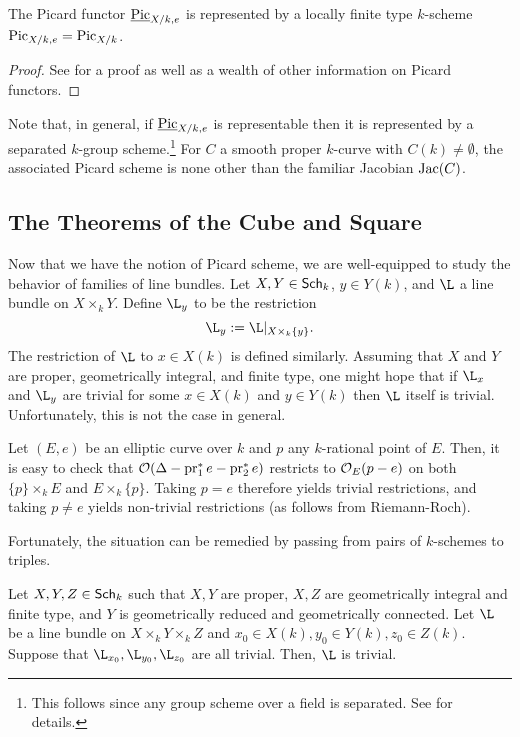 \documentclass[11pt]{article}
\begin{document}
\begin{theorem}\label{Picard_Rep_Thm}
The Picard functor $\underline{\operatorname{Pic}}_{X/k,e}$ is represented by a locally finite type $k$-scheme $\operatorname{Pic}_{X/k,e}=\operatorname{Pic}_{X/k}$.
\end{theorem}

\begin{proof}
See \cite[\textrm{Part 5}]{Fantechi} for a proof as well as a wealth of other information on Picard functors.
\end{proof}

Note that, in general, if $\underline{\operatorname{Pic}}_{X/k,e}$ is representable then it is represented by a separated $k$-group scheme.\footnote{This follows since any group scheme over a field is separated. See \cite[\textrm{Tag 047G and 047J}]{Stack} for details.} For $C$ a smooth proper $k$-curve with $C(k)\neq\emptyset$, the associated Picard scheme is none other than the familiar Jacobian $\operatorname{Jac}(C)$.

\subsection{The Theorems of the Cube and Square}
Now that we have the notion of Picard scheme, we are well-equipped to study the behavior of families of line bundles. Let $X,Y\in\operatorname{\mathsf{Sch}}_k$, $y\in Y(k)$, and $\L$ a line bundle on $X\times_kY$. Define $\L_y$ to be the restriction
$$\L_y:=\L|_{X\times_k\{y\}}.$$
The restriction of $\L$ to $x\in X(k)$ is defined similarly. Assuming that $X$ and $Y$ are proper, geometrically integral, and finite type, one might hope that if $\L_x$ and $\L_y$ are trivial for some $x\in X(k)$ and $y\in Y(k)$ then $\L$ itself is trivial. Unfortunately, this is not the case in general.

\begin{example}
Let $(E,e)$ be an elliptic curve over $k$ and $p$ any $k$-rational point of $E$. Then, it is easy to check that $\mathcal{O}(\Delta-\operatorname{pr}_1^*e-\operatorname{pr}_2^*e)$ restricts to $\mathcal{O}_E(p-e)$ on both $\{p\}\times_kE$ and $E\times_k\{p\}$. Taking $p=e$ therefore yields trivial restrictions, and taking $p\neq e$ yields non-trivial restrictions (as follows from Riemann-Roch).
\end{example}

Fortunately, the situation can be remedied by passing from pairs of $k$-schemes to triples.

\begin{theorem}\label{Cube_Thm}
Let $X,Y,Z\in\operatorname{\mathsf{Sch}}_k$ such that $X,Y$ are proper, $X,Z$ are geometrically integral and finite type, and $Y$ is geometrically reduced and geometrically connected. Let $\L$ be a line bundle on $X\times_kY\times_kZ$ and $x_0\in X(k),y_0\in Y(k),z_0\in Z(k)$. Suppose that $\L_{x_0},\L_{y_0},\L_{z_0}$ are all trivial. Then, $\L$ is trivial.
\end{theorem}
\end{document}
